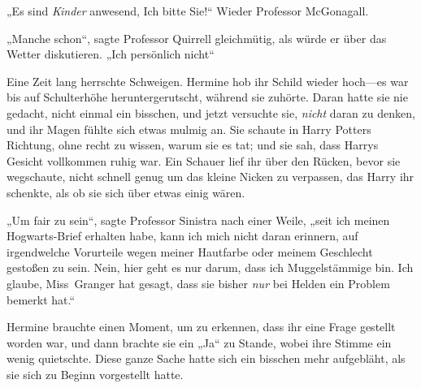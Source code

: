 „Es sind \emph{Kinder} anwesend, Ich bitte Sie!“ Wieder Professor McGonagall.

„Manche schon“, sagte Professor Quirrell gleichmütig, als würde er über das Wetter diskutieren. „Ich persönlich nicht“

Eine Zeit lang herrschte Schweigen. Hermine hob ihr Schild wieder hoch—es war bis auf Schulterhöhe heruntergerutscht, während sie zuhörte. Daran hatte sie nie gedacht, nicht einmal ein bisschen, und jetzt versuchte sie, \emph{nicht} daran zu denken, und ihr Magen fühlte sich etwas mulmig an. Sie schaute in Harry Potters Richtung, ohne recht zu wissen, warum sie es tat; und sie sah, dass Harrys Gesicht vollkommen ruhig war. Ein Schauer lief ihr über den Rücken, bevor sie wegschaute, nicht schnell genug um das kleine Nicken zu verpassen, das Harry ihr schenkte, als ob sie sich über etwas einig wären.

„Um fair zu sein“, sagte Professor Sinistra nach einer Weile, „seit ich meinen Hogwarts-Brief erhalten habe, kann ich mich nicht daran erinnern, auf irgendwelche Vorurteile wegen meiner Hautfarbe oder meinem Geschlecht gestoßen zu sein. Nein, hier geht es nur darum, dass ich Muggelstämmige bin. Ich glaube, Miss~Granger hat gesagt, dass sie bisher \emph{nur} bei Helden ein Problem bemerkt hat.“

Hermine brauchte einen Moment, um zu erkennen, dass ihr eine Frage gestellt worden war, und dann brachte sie ein „Ja“ zu Stande, wobei ihre Stimme ein wenig quietschte. Diese ganze Sache hatte sich ein bisschen mehr aufgebläht, als sie sich zu Beginn vorgestellt hatte.

